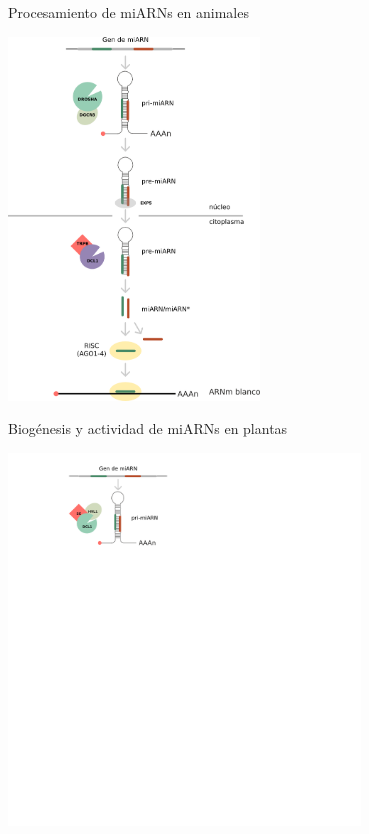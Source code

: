 \documentclass{beamer}
\begin{document}
\begin{frame}{Procesamiento de miARNs en animales}
	\begin{center}
		\includegraphics[width=0.5\textwidth]{img/procesamiento_animales.png}
	\end{center}
\end{frame}


\begin{frame}{Biogénesis y actividad de miARNs en plantas}
	\begin{center}
		\includegraphics[width=0.7\textwidth]{img/biogenesis_accion_defensa02.png}
	\end{center}
\end{frame}
\end{document}
